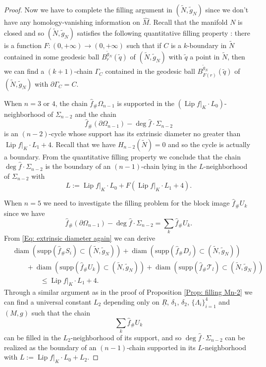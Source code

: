\documentclass[11pt,letterpaper]{amsart}
\numberwithin{equation}{section}
\theoremstyle{definition}
\DeclareMathOperator{\Lip}{Lip}
\DeclareMathOperator{\diam}{diam}
\newcommand{\ti}[1]{\tilde{#1}}
\begin{document}
\begin{proof}
Now we have to complete the filling argument in $(\tilde N,\tilde g_N)$ since we don't have any homology-vanishing information on $\widehat M$. Recall that the manifold $N$ is closed and so $(\tilde N,\tilde g_N)$ satisfies the following quantitative filling property \cite[Proposition 6]{CLL23}: there is a function $F:(0,+\infty)\to (0,+\infty)$ such that if $C$ is a $k$-boundary in $\tilde N$ contained in some geodesic ball $B_{r}^{\ti{g}_N}(\tilde q)$ of $(\ti N,\tilde g_N)$ with $\tilde q$ a point in $\tilde N$, then we can find a $(k+1)$-chain $\Gamma_C$ contained in the geodesic ball $B_{F(r)}^{\ti{g}_N}(\tilde q)$ of $(\tilde N,\tilde g_N)$ with $\partial\Gamma_C=C$.

When $n=3$ or $4$, the chain $\hat f_\#\Omega_{n-1}$ is supported in the $(\Lip f|_{K}\cdot L_0)$-neighborhood of $\Sigma_{n-2}$ and the chain
$$\hat f_\#(\partial\Omega_{n-1})-\deg\hat f\cdot \Sigma_{n-2}$$ is an $(n-2)$-cycle whose support has its extrinsic diameter no greater than $\Lip f|_{K}\cdot L_1+4$. Recall that we have $H_{n-2}(\tilde N)=0$ and so the cycle is actually a boundary. From the quantitative filling property we conclude that the chain $\deg \hat f\cdot \Sigma_{n-2}$ is the boundary of an $(n-1)$-chain lying in the $L$-neighborhood of $\Sigma_{n-2}$ with
$$L:=\Lip f|_{K}\cdot L_0+F(\Lip f|_{K}\cdot L_1+4).$$

When $n=5$ we need to investigate the filling problem for the block image $\hat f_\#U_k$ since we have
$$
\hat f_\#(\partial\Omega_{n-1})-\deg\hat f\cdot \Sigma_{n-2}=\sum_k\hat f_\#U_k.
$$
From \eqref{Eq: extrinsic diameter again} we can derive
\begin{equation*}
\begin{split}
&\diam(\mathrm{supp}(\hat f_\#S_{i})\subset (\tilde N,\tilde g_N))+\diam(\mathrm{supp}(\hat f_\#D_{j})\subset (\tilde N,\tilde g_N))\\
&\qquad+\diam(\mathrm{supp}(\hat f_\#U_{k})\subset (\tilde N,\tilde g_N))+
\diam(\mathrm{supp}(\hat f_\#\mathcal T_{l})\subset (\tilde N,\tilde g_N))\\
&\qquad\qquad\leq \Lip f|_{K}\cdot L_1+4.
\end{split}
\end{equation*}
Through a similar argument as in the proof of Proposition \ref{Prop: filling Mn-2} we can find a universal constant $L_2$ depending only on $\underline R$, $\delta_1$, $\delta_2$, $\{\Lambda_i\}_{i=1}^4$ and $(M,g)$ such that the chain
$$
\sum_k\hat f_\#U_k
$$
can be filled in the $L_2$-neighborhood of its support, and so $\deg\hat f\cdot \Sigma_{n-2}$ can be realized as the boundary of an $(n-1)$-chain supported in its $L$-neighborhood with $L:=\Lip f|_{K}\cdot L_0+L_2$.
\end{proof}
\end{document}
